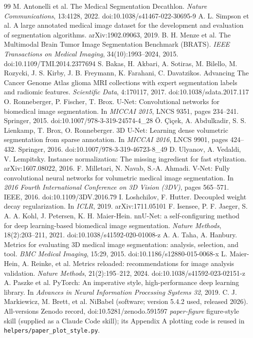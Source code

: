 \documentclass[11pt,a4paper]{article}
\begin{document}
\clearpage
\begin{thebibliography}{99}\small
{} M. Antonelli et al. The Medical Segmentation Decathlon. \emph{Nature Communications}, 13:4128, 2022. doi:10.1038/s41467-022-30695-9
 A. L. Simpson et al. A large annotated medical image dataset for the development and evaluation of segmentation algorithms. arXiv:1902.09063, 2019.
 B. H. Menze et al. The Multimodal Brain Tumor Image Segmentation Benchmark (BRATS). \emph{IEEE Transactions on Medical Imaging}, 34(10):1993--2024, 2015. doi:10.1109/TMI.2014.2377694
 S. Bakas, H. Akbari, A. Sotiras, M. Bilello, M. Rozycki, J. S. Kirby, J. B. Freymann, K. Farahani, C. Davatzikos. Advancing The Cancer Genome Atlas glioma MRI collections with expert segmentation labels and radiomic features. \emph{Scientific Data}, 4:170117, 2017. doi:10.1038/sdata.2017.117
 O. Ronneberger, P. Fischer, T. Brox. U-Net: Convolutional networks for biomedical image segmentation. In \emph{MICCAI 2015}, LNCS 9351, pages 234--241. Springer, 2015. doi:10.1007/978-3-319-24574-4\_28
 \"O. \c{C}i\c{c}ek, A. Abdulkadir, S. S. Lienkamp, T. Brox, O. Ronneberger. 3D U-Net: Learning dense volumetric segmentation from sparse annotation. In \emph{MICCAI 2016}, LNCS 9901, pages 424--432. Springer, 2016. doi:10.1007/978-3-319-46723-8\_49
 D. Ulyanov, A. Vedaldi, V. Lempitsky. Instance normalization: The missing ingredient for fast stylization. arXiv:1607.08022, 2016.
 F. Milletari, N. Navab, S.-A. Ahmadi. V-Net: Fully convolutional neural networks for volumetric medical image segmentation. In \emph{2016 Fourth International Conference on 3D Vision (3DV)}, pages 565--571. IEEE, 2016. doi:10.1109/3DV.2016.79
 I. Loshchilov, F. Hutter. Decoupled weight decay regularization. In \emph{ICLR}, 2019. arXiv:1711.05101
 F. Isensee, P. F. Jaeger, S. A. A. Kohl, J. Petersen, K. H. Maier-Hein. nnU-Net: a self-configuring method for deep learning-based biomedical image segmentation. \emph{Nature Methods}, 18(2):203--211, 2021. doi:10.1038/s41592-020-01008-z
 A. A. Taha, A. Hanbury. Metrics for evaluating 3D medical image segmentation: analysis, selection, and tool. \emph{BMC Medical Imaging}, 15:29, 2015. doi:10.1186/s12880-015-0068-x
 L. Maier-Hein, A. Reinke, et al. Metrics reloaded: recommendations for image analysis validation. \emph{Nature Methods}, 21(2):195--212, 2024. doi:10.1038/s41592-023-02151-z
 A. Paszke et al. PyTorch: An imperative style, high-performance deep learning library. In \emph{Advances in Neural Information Processing Systems 32}, 2019.
 C. J. Markiewicz, M. Brett, et al. NiBabel (software; version 5.4.2 used, released 2026). All-versions Zenodo record, doi:10.5281/zenodo.591597
 \emph{paper-figure} figure-style skill (supplied as a Claude Code skill); its Appendix A plotting code is reused in \texttt{helpers/paper\_plot\_style.py}.
\end{thebibliography}
\end{document}
